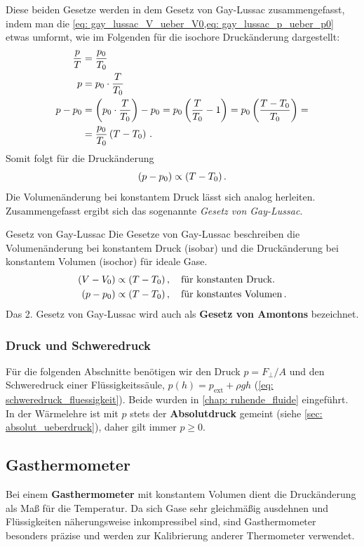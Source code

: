 Diese beiden Gesetze werden in dem Gesetz von Gay-Lussac zusammengefasst, indem man die \cref{eq: gay_lussac_V_ueber_V0,eq: gay_lussac_p_ueber_p0} etwas umformt, wie im Folgenden für die isochore Druckänderung dargestellt: 
\begin{align}
    \frac{p}{T} &= \frac{p_0}{T_0} \nonumber \\
    p &= p_0 \cdot \frac{T}{T_0} \nonumber \\
    p - p_0 &=  \left( p_0 \cdot \frac{T}{T_0} \right) - p_0 = p_0 \left( \frac{T}{T_0} - 1 \right) = p_0 \left( \frac{T - T_0}{T_0} \right) = \nonumber \\
    &= \frac{p_0}{T_0} \left( T - T_0 \right) \,.
\end{align}
Somit folgt für die Druckänderung 
\begin{equation}
    (p-p_0) \propto (T-T_0) \,.
\end{equation}
Die Volumenänderung bei konstantem Druck lässt sich analog herleiten. Zusammengefasst ergibt sich das sogenannte \textit{Gesetz von Gay-Lussac}.
\begin{importantbox}[]{Gesetz von Gay-Lussac}
    Die Gesetze von Gay-Lussac beschreiben die Volumenänderung bei konstantem Druck (isobar) und die Druckänderung bei konstantem Volumen (isochor) für ideale Gase. 
    \begin{equation}\begin{aligned}
        (V - V_0) &\propto (T - T_0) \,{,}\, \quad \text{für konstanten Druck.} \\
        (p - p_0) &\propto (T - T_0) \,{,}\, \quad \text{für konstantes Volumen} \,.
    \end{aligned}\end{equation}
Das 2. Gesetz von Gay-Lussac wird auch als \textbf{Gesetz von Amontons} bezeichnet.
\end{importantbox}

\subsubsection*{Druck und Schweredruck}
Für die folgenden Abschnitte benötigen wir den Druck $p = F_\perp/A$ und den Schweredruck einer Flüssigkeitssäule, $p(h) = p_{\text{ext}} + \rho g h$ (\cref{eq: schweredruck_fluessigkeit}). Beide wurden in \cref{chap: ruhende_fluide} eingeführt. In der Wärmelehre ist mit $p$ stets der \textbf{Absolutdruck} gemeint (siehe \cref{sec: absolut_ueberdruck}), daher gilt immer $p \ge 0$.

\subsection{Gasthermometer}\label{subsec: Gasthermometer}
Bei einem \textbf{Gasthermometer} mit konstantem Volumen dient die Druckänderung als Maß für die Temperatur. Da sich Gase sehr gleichmäßig ausdehnen und Flüssigkeiten näherungsweise inkompressibel sind, sind Gasthermometer besonders präzise und werden zur Kalibrierung anderer Thermometer verwendet. 

